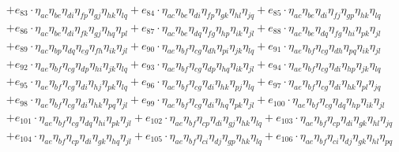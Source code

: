 \begin{itemize}
\begin{align}
    & + e_{83} \cdot \eta_{a c} \eta_{b e} \eta_{d i} \eta_{f p} \eta_{g j} \eta_{h k} \eta_{l q} + e_{84} \cdot \eta_{a c} \eta_{b e} \eta_{d i} \eta_{f p} \eta_{g k} \eta_{h l} \eta_{j q} + e_{85} \cdot \eta_{a c} \eta_{b e} \eta_{d i} \eta_{f j} \eta_{g p} \eta_{h k} \eta_{l q} \nonumber \\
    & + e_{86} \cdot \eta_{a c} \eta_{b e} \eta_{d i} \eta_{f k} \eta_{g j} \eta_{h q} \eta_{p l} + e_{87} \cdot \eta_{a c} \eta_{b e} \eta_{d q} \eta_{f g} \eta_{h p} \eta_{i k} \eta_{j l} + e_{88} \cdot \eta_{a c} \eta_{b e} \eta_{d q} \eta_{f g} \eta_{h i} \eta_{p k} \eta_{j l} \nonumber \\
    & + e_{89} \cdot \eta_{a c} \eta_{b p} \eta_{d q} \eta_{e g} \eta_{f h} \eta_{i k} \eta_{j l} + e_{90} \cdot \eta_{a e} \eta_{b f} \eta_{c g} \eta_{d h} \eta_{p i} \eta_{j k} \eta_{l q} + e_{91} \cdot \eta_{a e} \eta_{b f} \eta_{c g} \eta_{d h} \eta_{p q} \eta_{i k} \eta_{j l} \nonumber \\
    & + e_{92} \cdot \eta_{a e} \eta_{b f} \eta_{c g} \eta_{d p} \eta_{h i} \eta_{j k} \eta_{l q} + e_{93} \cdot \eta_{a e} \eta_{b f} \eta_{c g} \eta_{d p} \eta_{h q} \eta_{i k} \eta_{j l} + e_{94} \cdot \eta_{a e} \eta_{b f} \eta_{c g} \eta_{d i} \eta_{h p} \eta_{j k} \eta_{l q} \nonumber \\
    & + e_{95} \cdot \eta_{a e} \eta_{b f} \eta_{c g} \eta_{d i} \eta_{h j} \eta_{p k} \eta_{l q} + e_{96} \cdot \eta_{a e} \eta_{b f} \eta_{c g} \eta_{d i} \eta_{h k} \eta_{p j} \eta_{l q} + e_{97} \cdot \eta_{a e} \eta_{b f} \eta_{c g} \eta_{d i} \eta_{h k} \eta_{p l} \eta_{j q} \nonumber \\
    & + e_{98} \cdot \eta_{a e} \eta_{b f} \eta_{c g} \eta_{d i} \eta_{h k} \eta_{p q} \eta_{j l} + e_{99} \cdot \eta_{a e} \eta_{b f} \eta_{c g} \eta_{d i} \eta_{h q} \eta_{p k} \eta_{j l} + e_{100} \cdot \eta_{a e} \eta_{b f} \eta_{c g} \eta_{d q} \eta_{h p} \eta_{i k} \eta_{j l} \nonumber \\
    & + e_{101} \cdot \eta_{a e} \eta_{b f} \eta_{c g} \eta_{d q} \eta_{h i} \eta_{p k} \eta_{j l} + e_{102} \cdot \eta_{a e} \eta_{b f} \eta_{c p} \eta_{d i} \eta_{g j} \eta_{h k} \eta_{l q} + e_{103} \cdot \eta_{a e} \eta_{b f} \eta_{c p} \eta_{d i} \eta_{g k} \eta_{h l} \eta_{j q} \nonumber \\
    & + e_{104} \cdot \eta_{a e} \eta_{b f} \eta_{c p} \eta_{d i} \eta_{g k} \eta_{h q} \eta_{j l} + e_{105} \cdot \eta_{a e} \eta_{b f} \eta_{c i} \eta_{d j} \eta_{g p} \eta_{h k} \eta_{l q} + e_{106} \cdot \eta_{a e} \eta_{b f} \eta_{c i} \eta_{d j} \eta_{g k} \eta_{h l} \eta_{p q} \nonumber \\

\end{align}
\end{itemize}
